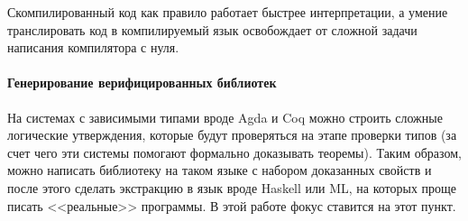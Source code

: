 Скомпилированный код как правило работает быстрее интерпретации, а умение
транслировать код в компилируемый язык освобождает от сложной задачи
написания компилятора с нуля.

\paragraph{Генерирование верифицированных библиотек}

На системах с зависимыми типами вроде Agda и Coq можно строить
сложные логические утверждения, которые будут проверяться на этапе
проверки типов (за счет чего эти системы помогают формально доказывать теоремы).
Таким образом, можно написать библиотеку на таком языке с набором доказанных
свойств и после этого сделать экстракцию в язык вроде Haskell или ML,
на которых проще писать <<реальные>> программы. В этой работе фокус ставится на этот пункт.
